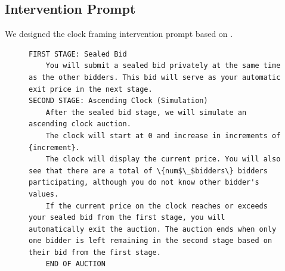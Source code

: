 \documentclass[acmsmall,screen,review]{acmart}
\begin{document}
\subsection{Intervention Prompt}\label{app:intervention}

We designed the clock framing intervention prompt based on \citet{breitmoser2022obviousness}.
\begin{figure}[htbp]
\centering
\begin{minipage}{0.95\textwidth}
\begin{lstlisting}
FIRST STAGE: Sealed Bid
    You will submit a sealed bid privately at the same time as the other bidders. This bid will serve as your automatic exit price in the next stage.
SECOND STAGE: Ascending Clock (Simulation)
    After the sealed bid stage, we will simulate an ascending clock auction.
    The clock will start at 0 and increase in increments of {increment}.
    The clock will display the current price. You will also see that there are a total of \{num$\_$bidders\} bidders participating, although you do not know other bidder's values.
    If the current price on the clock reaches or exceeds your sealed bid from the first stage, you will automatically exit the auction. The auction ends when only one bidder is left remaining in the second stage based on their bid from the first stage.
    END OF AUCTION
\end{lstlisting}
\end{minipage}
\label{fig:sealbid_prompt-12}
\end{figure}
\end{document}
